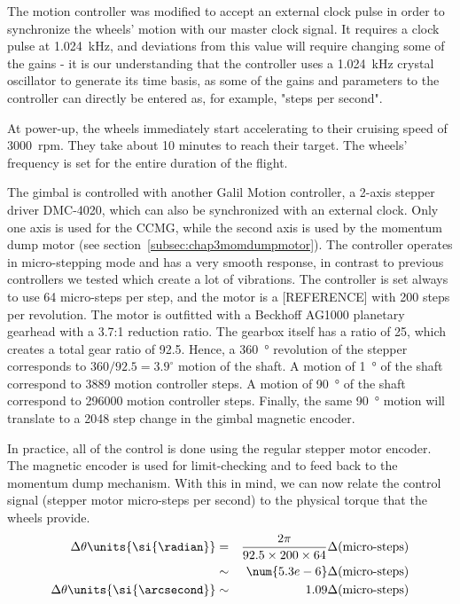 The motion controller was modified to accept an external clock pulse in order to synchronize the wheels' motion with our master clock signal. It requires a clock pulse at \SI{1.024}{\kilo\hertz}, and deviations from this value will require changing some of the gains - it is our understanding that the controller uses a \SI{1.024}{\kilo\hertz} crystal oscillator to generate its time basis, as some of the gains and parameters to the controller can directly be entered as, for example, "steps per second". 

At power-up, the wheels immediately start accelerating to their cruising speed of \num{3000}~rpm. They take about 10 minutes to reach their target. The wheels' frequency is set for the entire duration of the flight.

The gimbal is controlled with another Galil Motion controller, a 2-axis stepper driver DMC-4020, which can also be synchronized with an external clock. Only one axis is used for the CCMG, while the second axis is used by the momentum dump motor (see section~\ref{subsec:chap3momdumpmotor}). The controller operates in micro-stepping mode and has a very smooth response, in contrast to previous controllers we tested which create a lot of vibrations. The controller is set always to use 64 micro-steps per step, and the motor is a [REFERENCE] with 200 steps per revolution. The motor is outfitted with a Beckhoff AG1000 planetary gearhead with a 3.7:1 reduction ratio. The gearbox itself has a ratio of 25, which creates a total gear ratio of 92.5. Hence, a \SI{360}{\degree} revolution of the stepper corresponds to $360/92.5=3.9^\circ$ motion of the shaft. A motion of \SI{1}{\degree} of the shaft correspond to \num{3889} motion controller steps. A motion of \SI{90}{\degree} of the shaft correspond to \num{296000} motion controller steps. Finally, the same \SI{90}{\degree} motion will translate to a \num{2048} step change in the gimbal magnetic encoder.

In practice, all of the control is done using the regular stepper motor encoder. The magnetic encoder is used for limit-checking and to feed back to the momentum dump mechanism. With this in mind, we can now relate the control signal (stepper motor micro-steps per second) to the physical torque that the wheels provide. 
\begin{eqnarray}
\Delta\theta\units{\si{\radian}} &= &\frac{2\pi}{92.5\times 200\times 64}\Delta(\textrm{micro-steps}) \\ 
& \sim & \num{5.3e-6} \Delta(\textrm{micro-steps})\\
\Delta\theta\units{\si{\arcsecond}} &\sim &  1.09 \Delta(\textrm{micro-steps})
\end{eqnarray}

